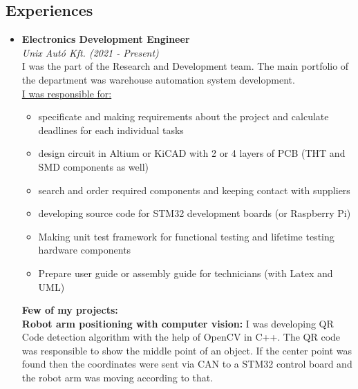 \documentclass[11pt,oneslide,a4paper,titlepage]{article}
\begin{document}
\begin{tcolorbox}
\begin{minipage}[t]{11cm}
\begin{tcolorbox}[grow to right by=0.75cm,colframe=white,colback=white]
			\section*{Experiences}
			\begin{itemize}
				\item{
					\textbf{Electronics Development Engineer} \\	
					\emph{Unix Autó Kft. (2021 - Present)} \\
					\newline I was the part of the Research and Development team. The main portfolio of the department was warehouse automation system development. \\
					\newline \underline{I was responsible for:}
					\begin{itemize}
						\item{specificate and making requirements about the project and calculate deadlines for each individual tasks}
						\item{design circuit in Altium or KiCAD with 2 or 4 layers of PCB (THT and SMD components as well)}
						\item{search and order required components and keeping contact with suppliers}
						\item{developing source code for STM32 development boards (or Raspberry Pi)}
						\item{Making unit test framework for functional testing and lifetime testing hardware components}
						\item{Prepare user guide or assembly guide for technicians (with Latex and UML)}
					\end{itemize}
					
					\hfill\break
					\textbf{Few of my projects:} \\
				    \newline \textbf{Robot arm positioning with computer vision:} I was developing QR Code detection algorithm with the help of OpenCV in C++. The QR code was responsible to show the middle point of an object. If the center point was found then the coordinates were sent via CAN to a STM32 control board and the robot arm was moving according to that. \\
				}
			\end{itemize}				
			
		\end{tcolorbox}
	\end{minipage}
\end{tcolorbox}
\end{document}
